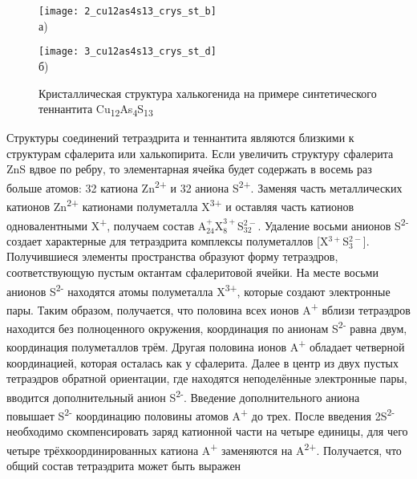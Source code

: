 \begin{figure}[pt!]
  \begin{minipage}[ht]{0.99\linewidth}\centering
    \texttt{[image: 2\_cu12as4s13\_crys\_st\_b]} \\ а)
  \end{minipage}
  \vfill
  \begin{minipage}[ht]{0.99\linewidth}\centering
    \texttt{[image: 3\_cu12as4s13\_crys\_st\_d]} \\ б)
  \end{minipage}

      \caption[Кристаллическая структура халькогенида на примере синтетического теннантита Cu\textsubscript{12}As\textsubscript{4}S\textsubscript{13}]{Кристаллическая структура халькогенида на примере синтетического теннантита Cu\textsubscript{12}As\textsubscript{4}S\textsubscript{13}}
    \label{img:figure1}
\end{figure}

Структуры соединений тетраэдрита и теннантита являются близкими к структурам сфалерита или халькопирита\cite{Pauling1934}.
Если увеличить структуру сфалерита ZnS вдвое по ребру, то элементарная ячейка будет содержать в восемь раз больше атомов: 32 катиона Zn\textsuperscript{2+} и 32 аниона S\textsuperscript{2+}. Заменяя часть металлических катионов Zn\textsuperscript{2+} катионами полуметалла X\textsuperscript{3+} и оставляя часть катионов одновалентными X\textsuperscript{+}, получаем состав A$^{+}_{24}$X$^{3+}_{8}$S$^{2-}_{32}$. Удаление восьми анионов S\textsuperscript{2-} создает характерные для тетраэдрита комплексы полуметаллов [X$^{3+}$S$^{2-}_{3}$]. Получившиеся элементы пространства образуют форму тетраэдров, соответствующую пустым октантам сфалеритовой ячейки. На месте восьми анионов S\textsuperscript{2-} находятся атомы полуметалла  X\textsuperscript{3+}, которые создают  электронные пары. Таким образом, получается, что половина всех ионов A\textsuperscript{+} вблизи тетраэдров находится без полноценного окружения, координация по анионам S\textsuperscript{2-} равна двум, координация полуметаллов трём. Другая половина ионов A\textsuperscript{+} обладает четверной координацией, которая осталась как у сфалерита. Далее в центр из двух пустых тетраэдров обратной ориентации, где находятся неподелённые электронные пары, вводится дополнительный анион S\textsuperscript{2-}. Введение дополнительного аниона повышает S\textsuperscript{2-}  координацию половины атомов A\textsuperscript{+} до трех. После введения 2S\textsuperscript{2-} необходимо скомпенсировать заряд катионной части на четыре единицы, для чего четыре трёхкоординированных катиона A\textsuperscript{+} заменяются на A\textsuperscript{2+}. Получается, что общий состав тетраэдрита может быть выражен

